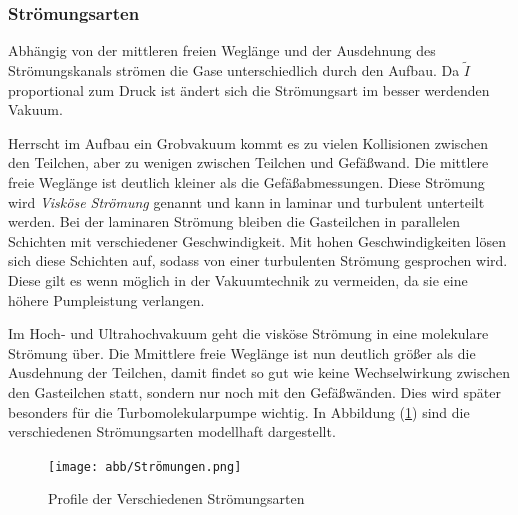 \subsubsection{Strömungsarten}
Abhängig von der mittleren freien Weglänge
und der Ausdehnung des Strömungskanals strömen die Gase unterschiedlich durch den Aufbau.
Da $\tilde{I}$ proportional zum Druck ist ändert sich die Strömungsart im besser werdenden Vakuum.

Herrscht im Aufbau ein Grobvakuum kommt es zu vielen Kollisionen zwischen den Teilchen,
aber zu wenigen zwischen Teilchen und Gefäßwand.
Die mittlere freie Weglänge ist deutlich kleiner als die Gefäßabmessungen.
Diese Strömung wird \textit{Visköse Strömung} genannt 
und kann in laminar und turbulent unterteilt werden.
Bei der laminaren Strömung bleiben die Gasteilchen in parallelen Schichten mit verschiedener Geschwindigkeit.
Mit hohen Geschwindigkeiten lösen sich diese Schichten auf, 
sodass von einer turbulenten Strömung gesprochen wird. 
Diese gilt es wenn möglich in der Vakuumtechnik zu vermeiden,
da sie eine höhere Pumpleistung verlangen.

Im Hoch- und Ultrahochvakuum geht die visköse Strömung in eine molekulare Strömung über.
Die Mmittlere freie Weglänge ist nun deutlich größer als die Ausdehnung der Teilchen,
damit findet so gut wie keine Wechselwirkung zwischen den Gasteilchen statt,
sondern nur noch mit den Gefäßwänden.
Dies wird später besonders für die Turbomolekularpumpe wichtig.
In Abbildung (\ref{fig:strömung}) sind die verschiedenen Strömungsarten modellhaft dargestellt.
\begin{figure}[h]
    \centering
    \texttt{[image: abb/Strömungen.png]}
    \caption{Profile der Verschiedenen Strömungsarten \cite{Pfeifer}}
    \label{fig:strömung}
\end{figure}

